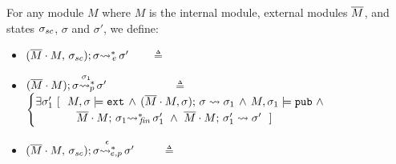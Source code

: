\begin{definition}
For any module $M$  where $M$ is the internal module, external modules $\Mtwo$, and states $\sigma\bd$,  $\sigma$ and $\sigma'$, we define:

\begin{itemize}
\item
 ${\leadstoBoundedThreeStarExt {\Mtwo\cdot M} {\sigma\bd}  {\sigma}  {\sigma'}}$ \ \ \ $\triangleq$ \ \ 
\item
${\WithPub {\Mtwo\cdot M}    {\sigma}  {\sigma'} {\sigma_1}}$ \  \ \  \ \ \ \ \ \ \ \ $\triangleq$ \ \ 
$\begin{cases}
\exists   \sigma_1'\ [ \ \   M, \sigma  \models \extThis \, \wedge \,  \leadstoBoundedThree  {\Mtwo\cdot M} {\sigma} {\sigma}  {\sigma_{1}}\, \wedge\,  M, \sigma_1 \models \pubMeth \ \wedge \\ 
\strut \ \ \ \ \  \ \ \ \ \ \   \leadstoBoundedStarFin {\Mtwo\cdot M} {\sigma_1}  {\sigma_1'}  \ \wedge \   \leadstoBounded  {\Mtwo\cdot M} {\sigma_1'}      {\sigma'} \ \ ] 
\end{cases}
$
\item
$\WithExtPub {\Mtwo\cdot M} {\sigma\bd}  {\sigma}  {\sigma'} {\epsilon}$ \ \     \ \  $\triangleq$ \ \ 

\end{itemize}
\end{definition}
